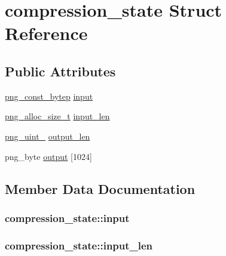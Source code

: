 \hypertarget{structcompression__state}{}\section{compression\+\_\+state Struct Reference}
\label{structcompression__state}
\subsection*{Public Attributes}
\begin{DoxyCompactItemize}
\item 
\hyperlink{pngconf_8h_a2e608af822427492832d11909c2f3fee}{png\+\_\+const\+\_\+bytep} \hyperlink{structcompression__state_adf14e1207e8d90e33e92cfb95b468d3b}{input}
\item 
\hyperlink{pngconf_8h_a4e009b891cfb02d2de674eca032d23cd}{png\+\_\+alloc\+\_\+size\+\_\+t} \hyperlink{structcompression__state_ac02652a570eb1e91af374bf683f6581b}{input\+\_\+len}
\item 
\hyperlink{pngrutil_8c_a89824d0e9f0724e3e7799b01a2b5fe58}{png\+\_\+uint\+\_} \hyperlink{structcompression__state_aea6eff8edf553a973c6fe2b9454d96a0}{output\+\_\+len}
\item 
png\+\_\+byte \hyperlink{structcompression__state_a8f655613a1bad5d242fb0b5a91420609}{output} \mbox{[}1024\mbox{]}
\end{DoxyCompactItemize}


\subsection{Member Data Documentation}
\hypertarget{structcompression__state_adf14e1207e8d90e33e92cfb95b468d3b}{}
\subsubsection[{input}]{ compression\+\_\+state\+::input}\label{structcompression__state_adf14e1207e8d90e33e92cfb95b468d3b}
\hypertarget{structcompression__state_ac02652a570eb1e91af374bf683f6581b}{}
\subsubsection[{input\+\_\+len}]{ compression\+\_\+state\+::input\+\_\+len}\label{structcompression__state_ac02652a570eb1e91af374bf683f6581b}
\hypertarget{structcompression__state_a8f655613a1bad5d242fb0b5a91420609}{}
